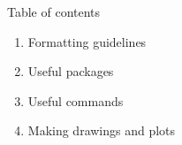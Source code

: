 
    
\begin{frame}{Table of contents}
    \begin{enumerate}\setlength{\itemsep}{+0.5 cm} %
        \item Formatting guidelines
        \item Useful packages
    	\item Useful commands
    	\item Making drawings and plots
    \end{enumerate}
\end{frame}